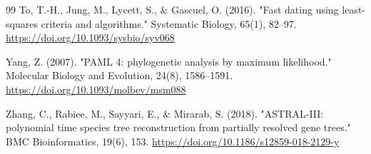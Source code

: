 \documentclass[10pt,letterpaper]{article}
\begin{document}
\begin{thebibliography}{99}
 To, T.-H., Jung, M., Lycett, S., \& Gascuel, O. (2016). "Fast dating using least-squares criteria and algorithms." Systematic Biology, 65(1), 82--97. \url{https://doi.org/10.1093/sysbio/syv068}

 Yang, Z. (2007). "PAML 4: phylogenetic analysis by maximum likelihood." Molecular Biology and Evolution, 24(8), 1586--1591. \url{https://doi.org/10.1093/molbev/msm088}

 Zhang, C., Rabiee, M., Sayyari, E., \& Mirarab, S. (2018). "ASTRAL-III: polynomial time species tree reconstruction from partially resolved gene trees." BMC Bioinformatics, 19(6), 153. \url{https://doi.org/10.1186/s12859-018-2129-y}
\end{thebibliography}
\end{document}

